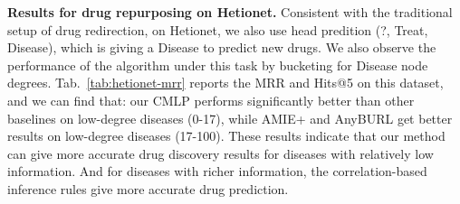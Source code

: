 
\noindent
\textbf{Results for drug repurposing on Hetionet.}
Consistent with the traditional setup of drug redirection, on Hetionet, we also use head predition (?, Treat, Disease), which is giving a Disease to predict new drugs. We also observe the performance of the algorithm under this task by bucketing for Disease node degrees.
Tab.~\ref{tab:hetionet-mrr} reports the MRR and Hits@5 on this dataset, and we can find that: our CMLP performs significantly better than other baselines on low-degree diseases (0-17), while AMIE+ and AnyBURL get better results on low-degree diseases (17-100).
These results indicate that our method can give more accurate drug discovery results for diseases with relatively low information.
And for diseases with richer information, the correlation-based inference rules give more accurate drug prediction.


